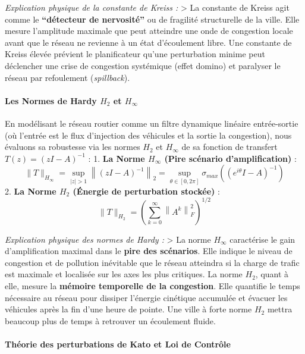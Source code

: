 \documentclass[10pt, a4paper]{article}
\begin{document}
\emph{Explication physique de la constante de Kreiss :} \textgreater{}
La constante de Kreiss agit comme le \textbf{``détecteur de nervosité''}
ou de fragilité structurelle de la ville. Elle mesure l'amplitude
maximale que peut atteindre une onde de congestion locale avant que le
réseau ne revienne à un état d'écoulement libre. Une constante de Kreiss
élevée prévient le planificateur qu'une perturbation minime peut
déclencher une crise de congestion systémique (effet domino) et
paralyser le réseau par refoulement (\emph{spillback}).

\paragraph{\texorpdfstring{Les Normes de Hardy \(H_2\) et
\(H_\infty\)}{Les Normes de Hardy H\_2 et H\_\textbackslash infty}}\label{les-normes-de-hardy-h_2-et-h_infty}

En modélisant le réseau routier comme un filtre dynamique linéaire
entrée-sortie (où l'entrée est le flux d'injection des véhicules et la
sortie la congestion), nous évaluons sa robustesse via les normes
\(H_2\) et \(H_\infty\) de sa fonction de transfert
\(T(z) = (zI - A)^{-1}\) : 1. \textbf{La Norme \(H_\infty\) (Pire
scénario d'amplification)} :
\[\|T\|_{H_\infty} = \sup_{|z| > 1} \left\| (zI - A)^{-1} \right\|_2 = \sup_{\theta \in [0, 2\pi]} \sigma_{max}\left( (e^{i\theta}I - A)^{-1} \right)\]
2. \textbf{La Norme \(H_2\) (Énergie de perturbation stockée)} :
\[\|T\|_{H_2} = \left( \sum_{k=0}^{\infty} \left\| A^k \right\|_F^2 \right)^{1/2}\]

\emph{Explication physique des normes de Hardy :} \textgreater{} La
norme \(H_\infty\) caractérise le gain d'amplification maximal dans le
\textbf{pire des scénarios}. Elle indique le niveau de congestion et de
pollution inévitable que le réseau atteindra si la charge de trafic est
maximale et localisée sur les axes les plus critiques. La norme \(H_2\),
quant à elle, mesure la \textbf{mémoire temporelle de la congestion}.
Elle quantifie le temps nécessaire au réseau pour dissiper l'énergie
cinétique accumulée et évacuer les véhicules après la fin d'une heure de
pointe. Une ville à forte norme \(H_2\) mettra beaucoup plus de temps à
retrouver un écoulement fluide.

\paragraph{Théorie des perturbations de Kato et Loi de
Contrôle}\label{thuxe9orie-des-perturbations-de-kato-et-loi-de-contruxf4le}
\end{document}
